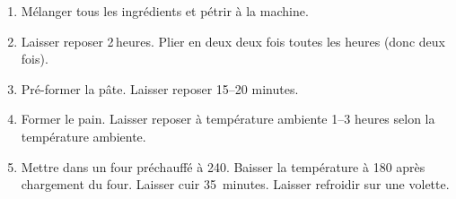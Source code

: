 
\begin{ingredients}
\end{ingredients}


\begin{recipe}
  \begin{enumerate}

  \item Mélanger tous les ingrédients et pétrir à la machine.
    
  \item Laisser reposer 2$\,$\fracH heures.  Plier en deux deux fois toutes
    les heures (donc deux fois).
    
  \item Pré-former la pâte.  Laisser reposer 15--20 minutes.
    
  \item Former le pain.  Laisser reposer à température ambiente 1--3
    heures selon la température ambiente.
    
  \item Mettre dans un four préchauffé à 240\degreeC.  Baisser la
    température à 180\degreeC{} après chargement du four.  Laisser cuir
    35~minutes.  Laisser refroidir sur une volette.

  \end{enumerate}
\end{recipe}

